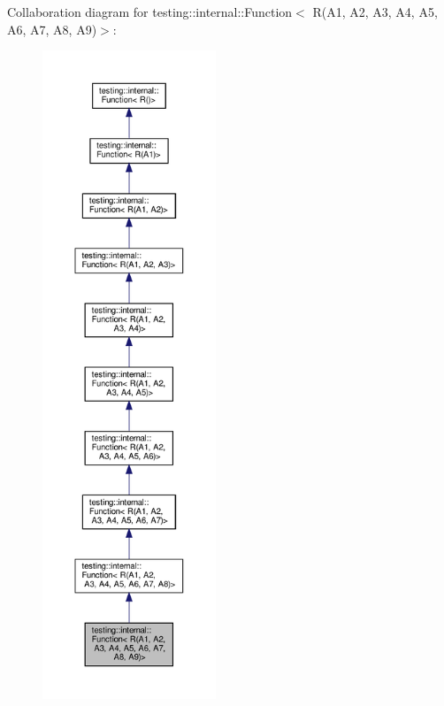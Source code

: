 Collaboration diagram for testing\+:\+:internal\+:\+:Function$<$ R(A1, A2, A3, A4, A5, A6, A7, A8, A9)$>$\+:
\nopagebreak
\begin{figure}[H]
\begin{center}
\leavevmode
\includegraphics[height=550pt]{structtesting_1_1internal_1_1_function_3_01_r_07_a1_00_01_a2_00_01_a3_00_01_a4_00_01_a5_00_01_a6280997655a43cdb8e9026ca030f678bd}
\end{center}
\end{figure}

